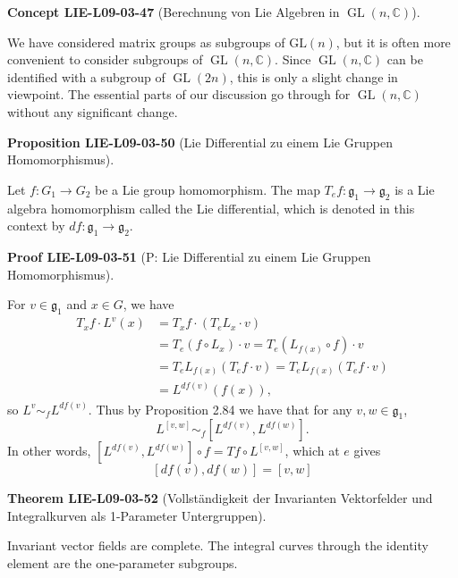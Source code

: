 \documentclass[10pt, letterpaper]{article}
\newcommand{\CustomHeading}[3]{%
  \par\medskip\noindent%
  \textbf{#1 #2} \textnormal{(#3)}.\enskip%
}
\newenvironment{PROP}[2]{\CustomHeading{Proposition}{#1}{#2}}{}
\newenvironment{THEO}[2]{\CustomHeading{Theorem}{#1}{#2}}{}
\newenvironment{CONC}[2]{\CustomHeading{Concept}{#1}{#2}}{}
\newenvironment{PROOF}[2]{\CustomHeading{Proof}{#1}{#2}}{}
\begin{document}
\begin{CONC}{LIE-L09-03-47}{Berechnung von Lie Algebren in $\operatorname{GL}(n, \mathbb{C})$}
We have considered matrix groups as subgroups of $\mathrm{GL}(n)$, but it is often more convenient to consider subgroups of $\operatorname{GL}(n, \mathbb{C})$. Since $\operatorname{GL}(n, \mathbb{C})$ can be identified with a subgroup of $\operatorname{GL}(2 n)$, this is only a slight change in viewpoint. The essential parts of our discussion go through for $\operatorname{GL}(n, \mathbb{C})$ without any significant change.
\end{CONC}

\begin{PROP}{LIE-L09-03-50}{Lie Differential zu einem Lie Gruppen Homomorphismus}
Let $f: G_{1} \rightarrow G_{2}$ be a Lie group homomorphism. The map $T_{e} f: \mathfrak{g}_{1} \rightarrow \mathfrak{g}_{2}$ is a Lie algebra homomorphism called the Lie differential, which is denoted in this context by $d f: \mathfrak{g}_{1} \rightarrow \mathfrak{g}_{2}$.
\end{PROP}

\begin{PROOF}{LIE-L09-03-51}{P: Lie Differential zu einem Lie Gruppen Homomorphismus}
For $v \in \mathfrak{g}_{1}$ and $x \in G$, we have
$$
\begin{aligned}
T_{x} f \cdot L^{v}(x) & =T_{x} f \cdot\left(T_{e} L_{x} \cdot v\right) \\
& =T_{e}\left(f \circ L_{x}\right) \cdot v=T_{e}\left(L_{f(x)} \circ f\right) \cdot v \\
& =T_{e} L_{f(x)}\left(T_{e} f \cdot v\right)=T_{e} L_{f(x)}\left(T_{e} f \cdot v\right) \\
& =L^{d f(v)}(f(x)),
\end{aligned}
$$
so $L^{v} \sim_{f} L^{d f(v)}$. Thus by Proposition 2.84 we have that for any $v, w \in \mathfrak{g}_{1}$,
$$
L^{[v, w]} \sim_{f}\left[L^{d f(v)}, L^{d f(w)}\right] .
$$
In other words, $\left[L^{d f(v)}, L^{d f(w)}\right] \circ f=T f \circ L^{[v, w]}$, which at $e$ gives
$$
[d f(v), d f(w)]=[v, w]
$$
\end{PROOF}

\begin{THEO}{LIE-L09-03-52}{Vollständigkeit der Invarianten Vektorfelder und Integralkurven als 1-Parameter Untergruppen}
Invariant vector fields are complete. The integral curves through the identity element are the one-parameter subgroups.
\end{THEO}
\end{document}
